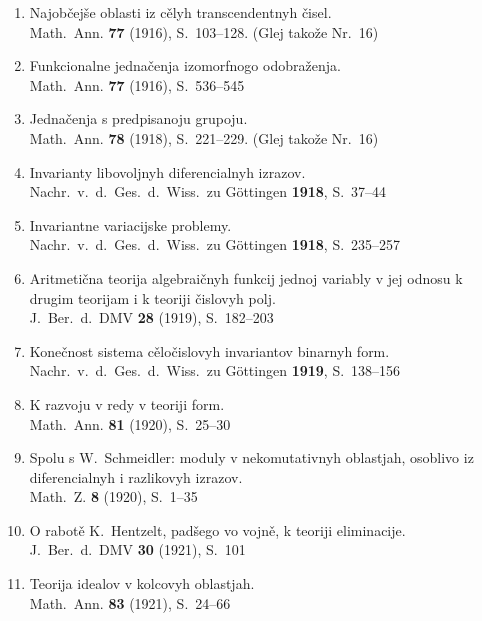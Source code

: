 \documentclass[11pt]{article}
\newcommand{\foreign}[1]{#1}
\begin{document}
\begin{enumerate}[label={\small\arabic*.},leftmargin=2em,itemsep=0.3em]
\item Najobčejše oblasti iz cělyh transcendentnyh čisel.\\
\foreign{Math.\ Ann.} \textbf{77} (1916), S.~103--128. (Glej takože Nr.~16)

\item Funkcionalne jednačenja izomorfnogo odobraženja.\\
\foreign{Math.\ Ann.} \textbf{77} (1916), S.~536--545

\item Jednačenja s predpisanoju grupoju.\\
\foreign{Math.\ Ann.} \textbf{78} (1918), S.~221--229. (Glej takože Nr.~16)

\item Invarianty libovoljnyh diferencialnyh izrazov.\\
\foreign{Nachr.\ v.\ d.\ Ges.\ d.\ Wiss.\ zu Göttingen} \textbf{1918}, S.~37--44

\item Invariantne variacijske problemy.\\
\foreign{Nachr.\ v.\ d.\ Ges.\ d.\ Wiss.\ zu Göttingen} \textbf{1918}, S.~235--257

\item Aritmetična teorija algebraičnyh funkcij jednoj variably v jej odnosu k drugim teorijam i k teoriji čislovyh polj.\\
\foreign{J.\ Ber.\ d.\ DMV} \textbf{28} (1919), S.~182--203

\item Konečnost sistema cěločislovyh invariantov binarnyh form.\\
\foreign{Nachr.\ v.\ d.\ Ges.\ d.\ Wiss.\ zu Göttingen} \textbf{1919}, S.~138--156

\item K razvoju v redy v teoriji form.\\
\foreign{Math.\ Ann.} \textbf{81} (1920), S.~25--30

\item Spolu s \foreign{W.\ Schmeidler}: moduly v nekomutativnyh oblastjah, osoblivo iz diferencialnyh i razlikovyh izrazov.\\
\foreign{Math.\ Z.} \textbf{8} (1920), S.~1--35

\item O rabotě K.\ Hentzelt, padšego vo vojně, k teoriji eliminacije.\\
\foreign{J.\ Ber.\ d.\ DMV} \textbf{30} (1921), S.~101

\item Teorija idealov v kolcovyh oblastjah.\\
\foreign{Math.\ Ann.} \textbf{83} (1921), S.~24--66


\end{enumerate}
\end{document}
